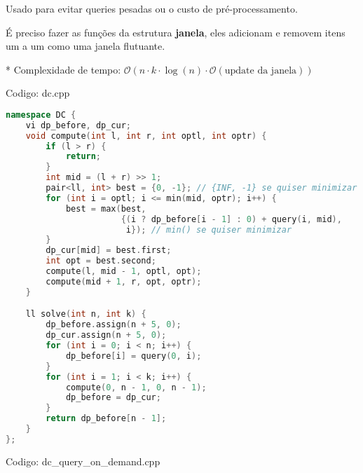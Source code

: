 \documentclass[10pt, a4paper, oneside]{book}
\begin{document}
Usado para evitar queries pesadas ou o custo de pré-processamento.  

É preciso fazer as funções da estrutura \textbf{janela}, eles adicionam e removem itens um a um como uma janela flutuante.



* Complexidade de tempo: $\mathcal{O}(n \cdot k \cdot \log(n) \cdot \mathcal{O}(\text{update da janela}))$
\hfill

Codigo: dc.cpp

\begin{lstlisting}[language=C++]
namespace DC {
    vi dp_before, dp_cur;
    void compute(int l, int r, int optl, int optr) {
        if (l > r) {
            return;
        }
        int mid = (l + r) >> 1;
        pair<ll, int> best = {0, -1}; // {INF, -1} se quiser minimizar
        for (int i = optl; i <= min(mid, optr); i++) {
            best = max(best,
                       {(i ? dp_before[i - 1] : 0) + query(i, mid),
                        i}); // min() se quiser minimizar
        }
        dp_cur[mid] = best.first;
        int opt = best.second;
        compute(l, mid - 1, optl, opt);
        compute(mid + 1, r, opt, optr);
    }

    ll solve(int n, int k) {
        dp_before.assign(n + 5, 0);
        dp_cur.assign(n + 5, 0);
        for (int i = 0; i < n; i++) {
            dp_before[i] = query(0, i);
        }
        for (int i = 1; i < k; i++) {
            compute(0, n - 1, 0, n - 1);
            dp_before = dp_cur;
        }
        return dp_before[n - 1];
    }
};
\end{lstlisting}
\hfill

Codigo: dc\_query\_on\_demand.cpp
\end{document}
